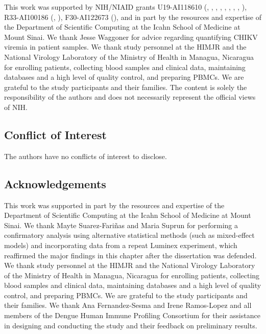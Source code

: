 This work was supported by NIH/NIAID grants U19-AI118610 (, , , , , , , , ), R33-AI100186 (, ), F30-AI122673 (), and in part by the resources and expertise of the Department of Scientific Computing at the Icahn School of Medicine at Mount Sinai. We thank Jesse Waggoner for advice regarding quantifying CHIKV viremia in patient samples. We thank study personnel at the HIMJR and the National Virology Laboratory of the Ministry of Health in Managua, Nicaragua for enrolling patients, collecting blood samples and clinical data, maintaining databases and a high level of quality control, and preparing PBMCs. We are grateful to the study participants and their families. The content is solely the responsibility of the authors and does not necessarily represent the official views of NIH.

\subsection*{Conflict of Interest}

The authors have no conflicts of interest to disclose.

\subsection*{Acknowledgements}

This work was supported in part by the resources and expertise of the Department of Scientific Computing at the Icahn School of Medicine at Mount Sinai. We thank Mayte Suarez-Fariñas and Maria Suprun for performing a confirmatory analysis using alternative statistical methods (such as mixed-effect models) and incorporating data from a repeat Luminex experiment, which reaffirmed the major findings in this chapter after the dissertation was defended. We thank study personnel at the HIMJR and the National Virology Laboratory of the Ministry of Health in Managua, Nicaragua for enrolling patients, collecting blood samples and clinical data, maintaining databases and a high level of quality control, and preparing PBMCs. We are grateful to the study participants and their families. We thank Ana Fernandez-Sesma and Irene Ramos-Lopez and all members of the Dengue Human Immune Profiling Consortium for their assistance in designing and conducting the study and their feedback on preliminary results.